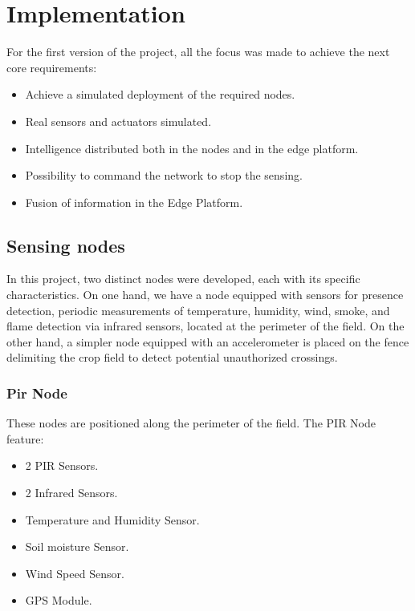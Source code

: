 \section{Implementation}

For the first version of the project, all the focus was made to achieve the next core requirements:
\begin{itemize}
    \item Achieve a simulated deployment of the required nodes.
    \item Real sensors and actuators simulated.
    \item Intelligence distributed both in the nodes and in the edge platform.
    \item Possibility to command the network to stop the sensing.
    \item Fusion of information in the Edge Platform.
\end{itemize}

\subsection{Sensing nodes}

In this project, two distinct nodes were developed, each with its specific characteristics. On one hand, we have a node equipped with sensors for presence detection, 
periodic measurements of temperature, humidity, wind, smoke, and flame detection via infrared sensors, located at the perimeter of the field. On the other hand, a 
simpler node equipped with an accelerometer is placed on the fence delimiting the crop field to detect potential unauthorized crossings.

\subsubsection*{Pir Node}


These nodes are positioned along the perimeter of the field. The PIR Node feature:
\begin{itemize}
    \item 2 PIR Sensors.
    \item 2 Infrared Sensors.
    \item Temperature and Humidity Sensor.
    \item Soil moisture Sensor.
    \item Wind Speed Sensor.
    \item GPS Module.
\end{itemize}

